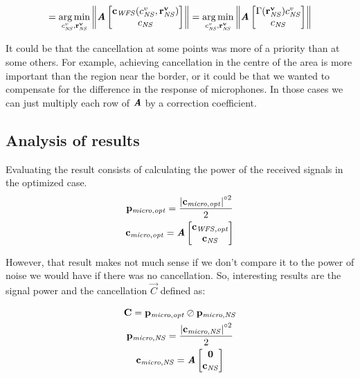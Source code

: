 \begin{equation}
[\cnsScalar^v, \vec{r_{\mathit{NS}}^v}] =
\argmin_{\cnsScalar^v, \vec{r_{\mathit{NS}}^v}}
\norm{\myMatrix{A}
	\begin{bmatrix}
	\vec{c_\mathit{WFS}}(\cnsScalar^v, \vec{r_{\mathit{NS}}^v})\\
	\cnsScalar\\
	\end{bmatrix}
} =
\argmin_{\cnsScalar^v, \vec{r_{\mathit{NS}}^v}}
\norm{\myMatrix{A}
	\begin{bmatrix}
	\wfsNormCoef[mat](\vec{r_{\mathit{NS}}^v})\cnsScalar^v\\
	\cnsScalar\\
	\end{bmatrix}
}
\end{equation}

It could be that the cancellation at some points was more of a priority than at some others. For example, achieving cancellation in the centre of the area is more important than the region near the border, or it could be that we wanted to compensate for the difference in the response of microphones. In those cases we can just multiply each row of $\bm{\mathit{A}}$ by a correction coefficient.

\subsection{Analysis of results}
Evaluating the result consists of calculating the power of the received signals in the optimized case.
\begin{gather}
	\mathbf{p_\mathit{micro,opt}} = \frac{\left| \mathbf{c_{\mathit{micro,opt}}} \right|^{\circ 2}}{2}
	\\
	\mathbf{c_\mathit{\mathit{micro,opt}}} = \bm{\mathit{A}}
	\begin{bmatrix}
	\mathbf{c_\mathit{WFS,opt}} \\
	\mathbf{c_{\mathit{NS}}}
	\end{bmatrix}
\end{gather}

However, that result makes not much sense if we don't compare it to the power of noise we would have if there was no cancellation. So, interesting results are the signal power and the cancellation $\vec{C}$ defined as:

\begin{gather}
\mathbf{C} = \mathbf{p_\mathit{micro,opt}} \oslash \mathbf{p_\mathit{micro,NS}} \\
\mathbf{p_\mathit{micro,NS}} = \frac{\left| \mathbf{c_{\mathit{micro,NS}}} \right|^{\circ 2}}{2}\\
\mathbf{c_{\mathit{micro,NS}}} = \bm{\mathit{A}} 
\begin{bmatrix}
	\mathbf{0} \\
	\mathbf{c_{\mathit{NS}}}
\end{bmatrix}
\end{gather}

